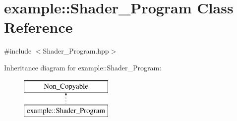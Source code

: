 \section{example\+::Shader\+\_\+\+Program Class Reference}
\label{classexample_1_1_shader___program}


{\ttfamily \#include $<$Shader\+\_\+\+Program.\+hpp$>$}

Inheritance diagram for example\+::Shader\+\_\+\+Program\+:\begin{figure}[H]
\begin{center}
\leavevmode
\includegraphics[height=2.000000cm]{classexample_1_1_shader___program}
\end{center}
\end{figure}
